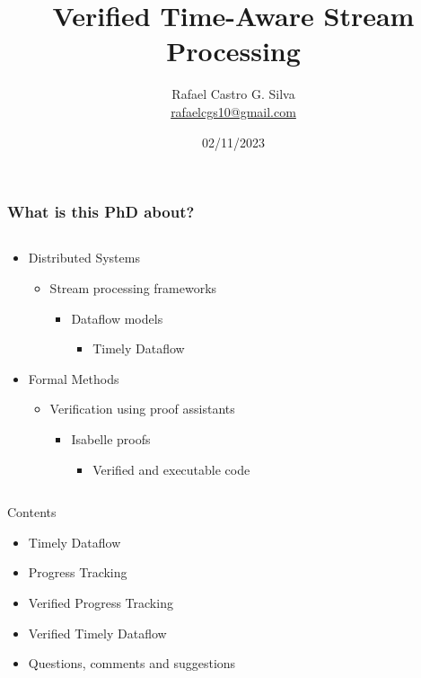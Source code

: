 \documentclass[aspectratio=169,10pt]{beamer}
\title[Verified Time-Aware Stream Processing]{Verified Time-Aware Stream Processing}
\author[Rafael Castro]{
  Rafael Castro G. Silva\\\medskip
  {\small \url{rafaelcgs10@gmail.com}}}
\date{02/11/2023}
\institute[UCPH]{
  Department of Computer Science \\
  University of Copenhagen}
\begin{document}
\begin{frame}
  \titlepage

\end{frame}

\begin{frame}[fragile]
  \frametitle{What is this PhD about?}
  \begin{columns}
    \begin{column}{0.45\textwidth}
      \begin{itemize}
        \item Distributed Systems
              \begin{itemize}
                \item Stream processing frameworks
                      \begin{itemize}
                        \item Dataflow models
                              \begin{itemize}
                                \item Timely Dataflow
                              \end{itemize}
                      \end{itemize}
              \end{itemize}
        \item Formal Methods
              \begin{itemize}
                \item Verification using proof assistants
                      \begin{itemize}
                        \item Isabelle proofs
                              \begin{itemize}
                                \item Verified and executable code
                              \end{itemize}
                      \end{itemize}
              \end{itemize}
      \end{itemize}
    \end{column}
    \begin{column}{0.55\textwidth}
    \end{column}
  \end{columns}
\end{frame}

\begin{frame}{Contents}
  \begin{itemize}
    \item Timely Dataflow
    \item Progress Tracking
    \item Verified Progress Tracking
    \item Verified Timely Dataflow
    \item Questions, comments and suggestions
  \end{itemize}
\end{frame}
\end{document}
